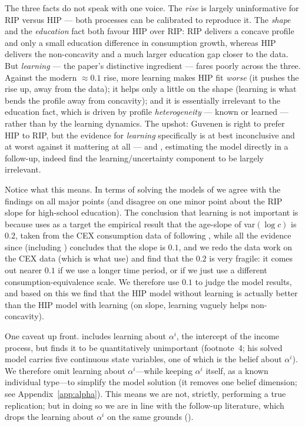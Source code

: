 \documentclass[11pt,fleqn]{article}
\begin{document}
The three facts do not speak with one voice. The \emph{rise} is largely uninformative for RIP versus HIP --- both processes can be calibrated to reproduce it. The \emph{shape} and the \emph{education} fact both favour HIP over RIP: RIP delivers a concave profile and only a small education difference in consumption growth, whereas HIP delivers the non-concavity and a much larger education gap closer to the data. But \emph{learning} --- the paper's distinctive ingredient --- fares poorly across the three. Against the modern $\approx0.1$ rise, more learning makes HIP fit \emph{worse} (it pushes the rise up, away from the data); it helps only a little on the shape (learning is what bends the profile away from concavity); and it is essentially irrelevant to the education fact, which is driven by profile \emph{heterogeneity} --- known or learned --- rather than by the learning dynamics. The upshot: Guvenen is right to prefer HIP to RIP, but the evidence for \emph{learning} specifically is at best inconclusive and at worst against it mattering at all --- and \cite{GuvenenSmith2014}, estimating the model directly in a follow-up, indeed find the learning/uncertainty component to be largely irrelevant.

Notice what this means. In terms of solving the models of \cite{Guvenen2007} we agree with the findings on all major points (and disagree on one minor point about the RIP slope for high-school education). The conclusion that learning is not important is because \cite{Guvenen2007} uses as a target the empirical result that the age-slope of var$(\log c)$ is $0.2$, taken from the CEX consumption data of \cite{KruegerPerri2006} following \cite{DeatonPaxson1994}, while all the evidence since (including \cite{GuvenenSmith2014}) concludes that the slope is $0.1$, and we redo the data work on the CEX data (which is what \cite{KruegerPerri2006} use) and find that the $0.2$ is very fragile: it comes out nearer $0.1$ if we use a longer time period, or if we just use a different consumption-equivalence scale. We therefore use $0.1$ to judge the model results, and based on this we find that the HIP model without learning is actually better than the HIP model with learning (on slope, learning vaguely helps non-concavity).

One caveat up front. \cite{Guvenen2007} includes learning about $\alpha^i$, the intercept of the income process, but finds it to be quantitatively unimportant (footnote~4; his solved model carries five continuous state variables, one of which is the belief about $\alpha^i$). We therefore omit learning about $\alpha^i$---while keeping $\alpha^i$ itself, as a known individual type---to simplify the model solution (it removes one belief dimension; see Appendix~\ref{app:alpha}). This means we are not, strictly, performing a true replication; but in doing so we are in line with the follow-up literature, which drops the learning about $\alpha^i$ on the same grounds (\citealp[footnote~6]{GuvenenSmith2014}).
\end{document}
